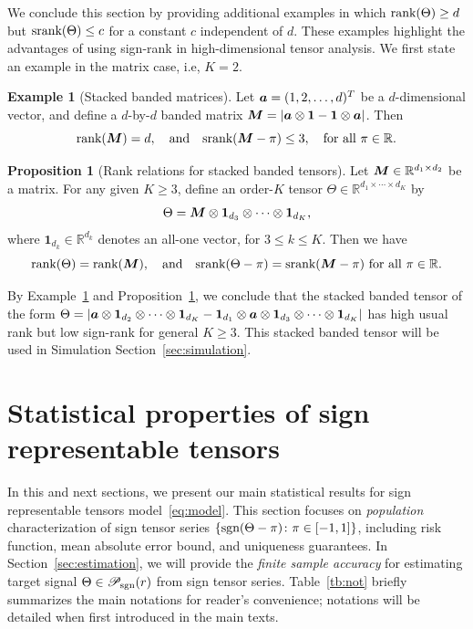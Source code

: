 \documentclass[twoside,11pt]{article}
\theoremstyle{definition}
\newtheorem{prop}{Proposition}
\newtheorem{example}{Example}
\def\sign{\textup{sgn}}
\def\srank{\textup{srank}}
\def\rank{\textup{rank}}
\def\caliP{\mathscr{P}_{\textup{sgn}}}
\begin{document}
We conclude this section by providing additional examples in which $\rank(\Theta)\geq d$ but $\srank(\Theta)\leq c$ for a constant $c$ independent of $d$. These examples highlight the advantages of using sign-rank in high-dimensional tensor analysis. We first state an example in the matrix case, i.e, $K=2$. 


\begin{example}[Stacked banded matrices]\label{example:banded} Let $\bm{a}=(1,2,\ldots,d)^T$ be a $d$-dimensional vector, and define a $d$-by-$d$ banded matrix $\bm M=|\bm{a}\otimes \mathbf{1}-\mathbf{1}\otimes \bm{a}|$. Then
\[
\rank(\mM)=d,\quad \text{and}\quad \srank(\mM-\pi)\leq 3, \quad \text{for all }\pi\in \mathbb{R}.
\]
\end{example}

\begin{prop}[Rank relations for stacked banded tensors]\label{prop:connection}Let $\bm M\in\mathbb{R}^{d_1\times d_2}$ be a matrix. For any given $K\geq 3$, define an order-$K$ tensor $\Theta\in\mathbb{R}^{d_1\times \cdots \times d_K}$ by
\[
\Theta=\bm M\otimes \mathbf{1}_{d_3}\otimes \cdots \otimes \mathbf{1}_{d_K},
\] 
where $\mathbf{1}_{d_k}\in\mathbb{R}^{d_k}$ denotes an all-one vector, for $3\leq k\leq K$. Then we have
\[
\rank(\Theta)=\rank(\mM),\quad \text{and}\quad \srank(\Theta-\pi)=\srank(\mM-\pi) \ \text{for all $\pi\in\mathbb{R}$}.
\] 
\end{prop}

By Example~\ref{example:banded} and Proposition~\ref{prop:connection}, we conclude that the stacked banded tensor of the form $\Theta=|\bm{a}\otimes\mathbf{1}_{d_2}\otimes \cdots \otimes \mathbf{1}_{d_K}-\mathbf{1}_{d_1}\otimes\bm{a}\otimes \mathbf{1}_{d_3}\otimes \cdots \otimes \mathbf{1}_{d_K}|$ has high usual rank but low sign-rank for general $K\geq 3$. This stacked banded tensor will be used in Simulation Section~\ref{sec:simulation}.  


\section{Statistical properties of sign representable tensors}\label{sec:stat}
In this and next sections, we present our main statistical results for sign representable tensors model~\eqref{eq:model}. This section focuses on \emph{population} characterization of sign tensor series $\{\sign(\Theta-\pi)\colon \pi\in[-1,1]\}$, including risk function, mean absolute error bound, and uniqueness guarantees. In Section~\ref{sec:estimation}, we will provide the \emph{finite sample accuracy} for estimating target signal $\Theta\in\caliP(r)$ from sign tensor series. Table~\ref{tb:not} briefly summarizes the main notations for reader's convenience; notations will be detailed when first introduced in the main texts. 
\end{document}

